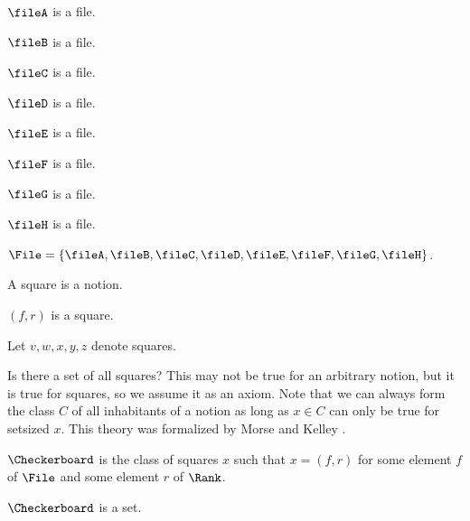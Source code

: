 \begin{forthel}
    \begin{signature} $\fileA$ is a file. \end{signature}
    \begin{signature} $\fileB$ is a file. \end{signature}
    \begin{signature} $\fileC$ is a file. \end{signature}
    \begin{signature} $\fileD$ is a file. \end{signature}
    \begin{signature} $\fileE$ is a file. \end{signature}
    \begin{signature} $\fileF$ is a file. \end{signature}
    \begin{signature} $\fileG$ is a file. \end{signature}
    \begin{signature} $\fileH$ is a file. \end{signature}

    \begin{definition}
        $\File = \{\fileA,\fileB,\fileC,\fileD,\fileE,\fileF,\fileG,\fileH\}$.
    \end{definition}

    \begin{signature} A square is a notion. \end{signature}
    \begin{axiom} $(f, r)$ is a square. \end{axiom}
    Let $v, w, x, y, z$ denote squares.
\end{forthel}

Is there a set of all squares? This may not be true for an arbitrary notion,
but it is true for squares, so we assume it as an axiom. Note that we can always
form the class $C$ of all inhabitants of a notion as long as $x \in C$ can only be true
for setsized $x$. This theory was formalized by Morse and Kelley \cite{Kelley1975,Morse1965}.

\begin{forthel}
    \begin{definition}
        $\Checkerboard$ is the class of squares $x$ such that $x = (f, r)$ for some
        element $f$ of $\File$ and some element $r$ of $\Rank$.
    \end{definition}

    \begin{axiom} $\Checkerboard$ is a set. \end{axiom}
\end{forthel}



